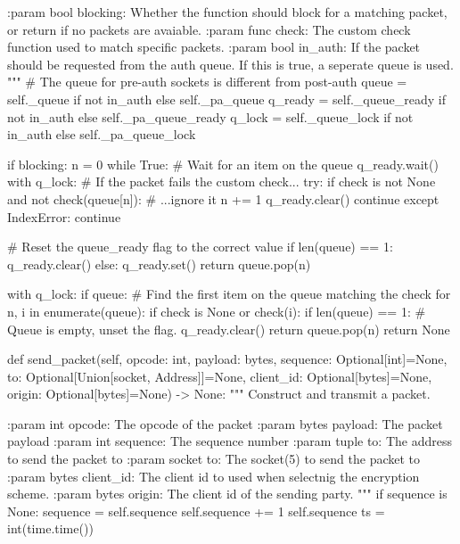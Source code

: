 \begin{pythoncode}
        :param bool blocking: Whether the function should block for a matching
                              packet, or return if no packets are avaiable.
        :param func check: The custom check function used to match specific
                           packets.
        :param bool in_auth: If the packet should be requested from the auth
                             queue. If this is true, a seperate queue is used.
        """
        # The queue for pre-auth sockets is different from post-auth
        queue = self._queue if not in_auth else self._pa_queue
        q_ready = self._queue_ready if not in_auth else self._pa_queue_ready
        q_lock = self._queue_lock if not in_auth else self._pa_queue_lock

        if blocking:
            n = 0
            while True:
                # Wait for an item on the queue
                q_ready.wait()
                with q_lock:
                    # If the packet fails the custom check...
                    try:
                        if check is not None and not check(queue[n]):
                            # ...ignore it
                            n += 1
                            q_ready.clear()
                            continue
                    except IndexError:
                        continue

                    # Reset the queue\_ready flag to the correct value
                    if len(queue) == 1:
                        q_ready.clear()
                    else:
                        q_ready.set()
                    return queue.pop(n)

        with q_lock:
            if queue:
                # Find the first item on the queue matching the check
                for n, i in enumerate(queue):
                    if check is None or check(i):
                        if len(queue) == 1:
                            # Queue is empty, unset the flag.
                            q_ready.clear()
                        return queue.pop(n)
            return None

    def send_packet(self, opcode: int, payload: bytes,
                    sequence: Optional[int]=None,
                    to: Optional[Union[socket, Address]]=None,
                    client_id: Optional[bytes]=None,
                    origin: Optional[bytes]=None) -> None:
        """
        Construct and transmit a packet.

        :param int opcode: The opcode of the packet
        :param bytes payload: The packet payload
        :param int sequence: The sequence number
        :param tuple to: The address to send the packet to
        :param socket to: The socket(5) to send the packet to
        :param bytes client_id: The client id to used when selectnig the
                                encryption scheme.
        :param bytes origin: The client id of the sending party.
        """
        if sequence is None:
            sequence = self.sequence
            self.sequence += 1
            self.sequence %
        ts = int(time.time())


\end{pythoncode}
